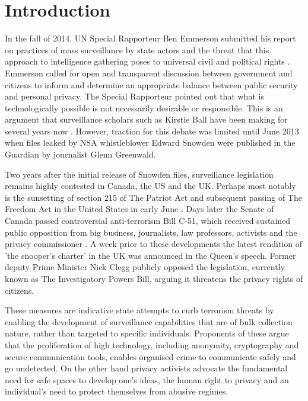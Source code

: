 \documentclass{llncs}
\begin{document}
\section{Introduction}
\label{sec:Introduction}
In the fall of 2014, UN Special Rapporteur Ben Emmerson submitted his report on practices of mass surveillance by state actors and the threat that this approach to intelligence gathering poses to universal civil and political rights \cite{Emerson}. Emmerson called for open and transparent discussion between government and citizens to inform and determine an appropriate balance between public security and personal privacy. The Special Rapporteur pointed out that what is technologically possible is not necessarily desirable or responsible. This is an argument that surveillance scholars such as Kirstie Ball have been making for several years now \cite{Ball}. However, traction for this debate was limited until June 2013 when files leaked by NSA whistleblower Edward Snowden were published in the Guardian by journalist Glenn Greenwald. 

Two years after the initial release of Snowden files, surveillance legislation remains highly contested in Canada, the US and the UK. Perhaps most notably is the sunsetting of section 215 of The Patriot Act and subsequent passing of The Freedom Act in the United States in early June \cite{Patriot}. Days later the Senate of Canada passed controversial anti-terrorism Bill C-51, which received sustained public opposition from big business, journalists, law professors, activists and the privacy commissioner \cite{C-51}. A week prior to these developments the latest rendition of ’the snooper’s charter’ in the UK was announced in the Queen’s speech. Former deputy Prime Minister Nick Clegg publicly opposed the legislation, currently known as The Investigatory Powers Bill, arguing it threatens the privacy rights of citizens.  

These measures are indicative state attempts to curb terrorism threats by enabling the development of surveillance capabilities that are of bulk collection nature, rather than targeted to specific individuals. Proponents of these argue that the proliferation of high technology, including anonymity, cryptography and secure communication tools, enables organised crime to communicate safely and go undetected. On the other hand privacy activists advocate the fundamental need for safe spaces to develop one's ideas, the human right to privacy and an individual's need to protect themselves from abusive regimes.
\end{document}
